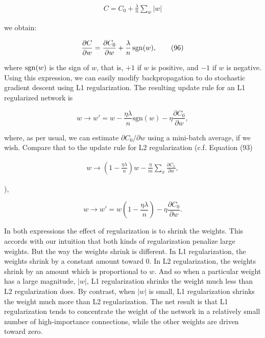 \begin{align*}
C = C_0 + \frac{\lambda}{n} \sum_w |w| \nonumber
\end{align*}

\noindent we obtain:

\begin{equation}
\frac{\partial C}{\partial w} = \frac{\partial C_0}{\partial w} + \frac{\lambda}{n} \, {\rm sgn}(w),
\tag{96}
\end{equation}

\noindent where ${\rm sgn}(w)$ is the sign of $w$, that is, $+1$ if $w$ is positive, and $-1$ if $w$ is negative. Using this expression, we can easily modify backpropagation to do stochastic gradient descent using L1 regularization. The resulting update rule for an L1 regularized network is

\begin{equation}
w \rightarrow w' = w-\frac{\eta \lambda}{n} \mbox{sgn}(w) - \eta \frac{\partial C_0}{\partial w},
\tag{97}
\end{equation}

\noindent where, as per usual, we can estimate $\partial C_0 / \partial w$ using a mini-batch average, if we wish. Compare that to the update rule for L2 regularization (c.f. Equation (93)

\begin{align*}
w \rightarrow \left(1-\frac{\eta \lambda}{n}\right) w -\frac{\eta}{m} \sum_x \frac{\partial C_x}{\partial w}, \nonumber
\end{align*}

\noindent ),

\begin{equation}
w \rightarrow w' = w\left(1 - \frac{\eta \lambda}{n} \right) - \eta \frac{\partial C_0}{\partial w}.
\tag{98}
\end{equation}

\noindent In both expressions the effect of regularization is to shrink the weights. This accords with our intuition that both kinds of regularization penalize large weights. But the way the weights shrink is different. In L1 regularization, the weights shrink by a constant amount toward $0$. In L2 regularization, the weights shrink by an amount which is proportional to $w$. And so when a particular weight has a large magnitude, $|w|$, L1 regularization shrinks the weight much less than L2 regularization does. By contrast, when $|w|$ is small, L1 regularization shrinks the weight much more than L2 regularization. The net result is that L1 regularization tends to concentrate the weight of the network in a relatively small number of high-importance connections, while the other weights are driven toward zero.


